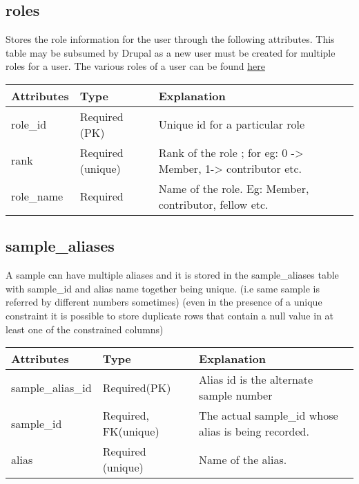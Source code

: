 \documentclass[letterpaper,10pt,english]{sphinxmanual}
\begin{document}
\subsection{roles}
\label{Table_Description:roles}
Stores the role information for the user through the following attributes. This table may be subsumed by Drupal as a new user must be created for multiple roles for a user. The various roles of a user can be found \href{http://wiki.cs.rpi.edu/trac/metpetdb/wiki/UserTypes}{here}

\begin{tabulary}{\linewidth}{|L|L|L|}
\hline
\textbf{
Attributes
} & \textbf{
Type
} & \textbf{
Explanation
}\\\hline

role\_id
 & 
Required (PK)
 & 
Unique id for a particular role
\\\hline

rank
 & 
Required (unique)
 & 
Rank of the role ; for eg: 0 -\textgreater{} Member, 1-\textgreater{} contributor etc.
\\\hline

role\_name
 & 
Required
 & 
Name of the role. Eg: Member, contributor, fellow etc.
\\\hline
\end{tabulary}



\subsection{sample\_aliases}
\label{Table_Description:sample-aliases}
A sample can have multiple aliases and it is stored in the sample\_aliases table with  sample\_id and alias name together being unique. (i.e same sample is referred by different numbers sometimes)
(even in the presence of a unique constraint it is possible to store duplicate rows that contain a null value in at least one of the constrained columns)

\begin{tabulary}{\linewidth}{|L|L|L|}
\hline
\textbf{
Attributes
} & \textbf{
Type
} & \textbf{
Explanation
}\\\hline

sample\_alias\_id
 & 
Required(PK)
 & 
Alias id is the alternate sample number
\\\hline

sample\_id
 & 
Required, FK(unique)
 & 
The actual sample\_id whose alias is being recorded.
\\\hline

alias
 & 
Required (unique)
 & 
Name of the alias.
\\\hline
\end{tabulary}
\end{document}
